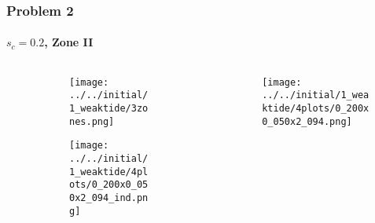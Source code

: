 \documentclass[dvipsnames, 11pt]{beamer}
\begin{document}
\begin{frame}
    \frametitle{Problem 2}
    \framesubtitle{$s_c = 0.2$, Zone II}

    \begin{columns}
        \begin{column}{0.5\textwidth}
            \begin{figure}
                \centering
                \begin{subfigure}{\columnwidth}
                    \centering
                    \texttt{[image: ../../initial/1\_weaktide/3zones.png]}
                \end{subfigure}

                \begin{subfigure}{\columnwidth}
                    \centering
                    \texttt{[image: ../../initial/1\_weaktide/4plots/0\_200x0\_050x2\_094\_ind.png]}
                \end{subfigure}
            \end{figure}
        \end{column}
        \begin{column}{0.5\textwidth}
            \begin{figure}[t]
                \centering
                \texttt{[image: ../../initial/1\_weaktide/4plots/0\_200x0\_050x2\_094.png]}
            \end{figure}
        \end{column}
    \end{columns}
\end{frame}
\end{document}
